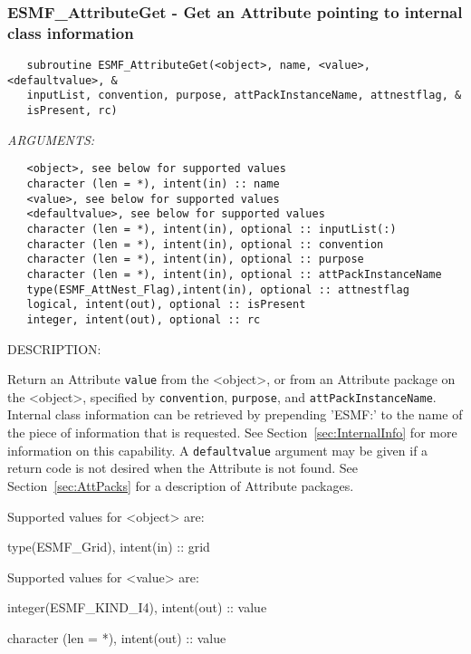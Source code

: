 \subsubsection [ESMF\_AttributeGet] {ESMF\_AttributeGet - Get an Attribute pointing to internal class information}


  
\begin{verbatim}   subroutine ESMF_AttributeGet(<object>, name, <value>, <defaultvalue>, &
   inputList, convention, purpose, attPackInstanceName, attnestflag, &
   isPresent, rc)\end{verbatim}{\em ARGUMENTS:}
\begin{verbatim}   <object>, see below for supported values
   character (len = *), intent(in) :: name
   <value>, see below for supported values
   <defaultvalue>, see below for supported values
   character (len = *), intent(in), optional :: inputList(:)
   character (len = *), intent(in), optional :: convention
   character (len = *), intent(in), optional :: purpose
   character (len = *), intent(in), optional :: attPackInstanceName
   type(ESMF_AttNest_Flag),intent(in), optional :: attnestflag
   logical, intent(out), optional :: isPresent
   integer, intent(out), optional :: rc\end{verbatim}
{\sf DESCRIPTION:\\ }


   Return an Attribute {\tt value} from the <object>, or from an Attribute
   package on the <object>, specified by {\tt convention},
   {\tt purpose}, and {\tt attPackInstanceName}. Internal class information can
   be retrieved by prepending 'ESMF:' to the name of the
   piece of information that is requested. See
   Section~\ref{sec:InternalInfo} for more information
   on this capability.
   A {\tt defaultvalue} argument
   may be given if a return code is not desired when the Attribute is not
   found. See Section~\ref{sec:AttPacks} for a description of Attribute
   packages.
  
   Supported values for <object> are:
   \begin{description}
   \item type(ESMF\_Grid), intent(in) :: grid
   \end{description}
  
   Supported values for <value> are:
   \begin{description}
   \item integer(ESMF\_KIND\_I4), intent(out) :: value
   \item character (len = *), intent(out) :: value
   \end{description}
  
